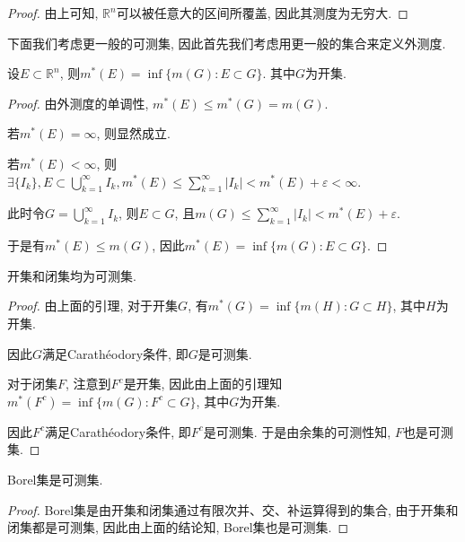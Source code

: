 \documentclass[theorem=false,mathfont=none,openany,sub3section]{easybook}
\begin{document}
\begin{proof}
  由上可知, $\mathbb{R}^n$可以被任意大的区间所覆盖, 因此其测度为无穷大.\par
\end{proof}

下面我们考虑更一般的可测集, 因此首先我们考虑用更一般的集合来定义外测度.\par

\begin{lemma}
  设$E\subset \mathbb{R}^n$, 则$m^{*}(E)=\inf\{m(G): E\subset G \}$. 其中$G$为开集.\par
\end{lemma}

\begin{proof}
  由外测度的单调性, $m^{*}(E)\leqslant m^{*}(G)=m(G)$.\par
  若$m^{*}(E)=\infty$, 则显然成立.\par
  若$m^{*}(E)<\infty$, 则$\exists \{I_k\}, E\subset \bigcup_{k=1}^{\infty}I_k, m^{*}(E)\leqslant \sum_{k=1}^{\infty}|I_k|<m^{*}(E)+\varepsilon<\infty$.\par
  此时令$G=\bigcup_{k=1}^{\infty}I_k$, 则$E\subset G$, 且$m(G)\leqslant \sum_{k=1}^{\infty}|I_k|<m^{*}(E)+\varepsilon$.\par
  于是有$m^{*}(E)\leqslant m(G)$, 因此$m^{*}(E)=\inf\{m(G): E\subset G \}$.\par
\end{proof}

\begin{lemma}
  开集和闭集均为可测集.\par
\end{lemma}

\begin{proof}
  由上面的引理, 对于开集$G$, 有$m^{*}(G)=\inf\{m(H): G\subset H \}$, 其中$H$为开集.\par
  因此$G$满足Carathéodory条件, 即$G$是可测集.\par
  对于闭集$F$, 注意到$F^c$是开集, 因此由上面的引理知$m^{*}(F^c)=\inf\{m(G): F^c\subset G \}$, 其中$G$为开集.\par
  因此$F^c$满足Carathéodory条件, 即$F^c$是可测集. 于是由余集的可测性知, $F$也是可测集.\par
\end{proof}

\begin{theorem}
  Borel集是可测集.\par
\end{theorem}

\begin{proof}
  Borel集是由开集和闭集通过有限次并、交、补运算得到的集合, 由于开集和闭集都是可测集, 因此由上面的结论知, Borel集也是可测集.\par
\end{proof}
\end{document}
